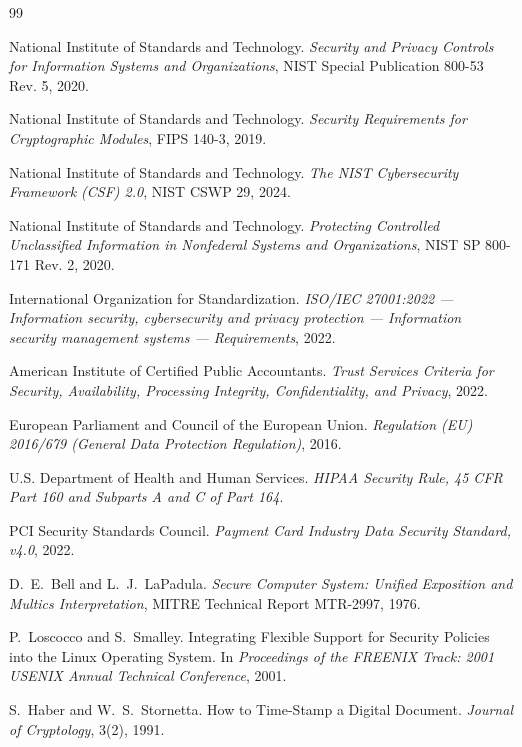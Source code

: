 \documentclass[11pt]{article}
\begin{document}
\begin{thebibliography}{99}

National Institute of Standards and Technology.
\emph{Security and Privacy Controls for Information Systems and
Organizations}, NIST Special Publication 800-53 Rev. 5, 2020.

National Institute of Standards and Technology.
\emph{Security Requirements for Cryptographic Modules}, FIPS 140-3,
2019.

National Institute of Standards and Technology.
\emph{The NIST Cybersecurity Framework (CSF) 2.0}, NIST CSWP 29, 2024.

National Institute of Standards and Technology.
\emph{Protecting Controlled Unclassified Information in Nonfederal
Systems and Organizations}, NIST SP 800-171 Rev. 2, 2020.

International Organization for Standardization.
\emph{ISO/IEC 27001:2022 --- Information security, cybersecurity and
privacy protection --- Information security management systems ---
Requirements}, 2022.

American Institute of Certified Public Accountants.
\emph{Trust Services Criteria for Security, Availability, Processing
Integrity, Confidentiality, and Privacy}, 2022.

European Parliament and Council of the European Union.
\emph{Regulation (EU) 2016/679 (General Data Protection Regulation)},
2016.

U.S. Department of Health and Human Services.
\emph{HIPAA Security Rule, 45 CFR Part 160 and Subparts A and C of Part
164}.

PCI Security Standards Council.
\emph{Payment Card Industry Data Security Standard, v4.0}, 2022.

D.~E.~Bell and L.~J.~LaPadula.
\emph{Secure Computer System: Unified Exposition and Multics
Interpretation}, MITRE Technical Report MTR-2997, 1976.

P.~Loscocco and S.~Smalley.
Integrating Flexible Support for Security Policies into the Linux
Operating System.
In \emph{Proceedings of the FREENIX Track: 2001 USENIX Annual
Technical Conference}, 2001.

S.~Haber and W.~S.~Stornetta.
How to Time-Stamp a Digital Document.
\emph{Journal of Cryptology}, 3(2), 1991.


\end{thebibliography}
\end{document}
